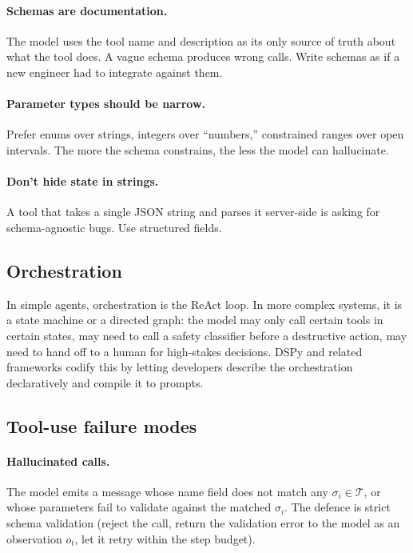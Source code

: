 \paragraph{Schemas are documentation.} The model uses the tool
name and description as its only source of truth about what the
tool does. A vague schema produces wrong calls. Write schemas as
if a new engineer had to integrate against them.

\paragraph{Parameter types should be narrow.} Prefer enums over
strings, integers over ``numbers,'' constrained ranges over open
intervals. The more the schema constrains, the less the model can
hallucinate.

\paragraph{Don't hide state in strings.} A tool that takes a
single JSON string and parses it server-side is asking for
schema-agnostic bugs. Use structured fields.

\subsection{Orchestration}

In simple agents, orchestration is the ReAct loop. In more
complex systems, it is a state machine or a directed graph: the
model may only call certain tools in certain states, may need to
call a safety classifier before a destructive action, may need to
hand off to a human for high-stakes decisions. DSPy
\citep{khattab2023dspy} and related frameworks codify this by
letting developers describe the orchestration declaratively and
compile it to prompts.

\subsection{Tool-use failure modes}

\paragraph{Hallucinated calls.} The model emits a message whose
name field does not match any $\sigma_i \in \mathcal{T}$, or whose
parameters fail to validate against the matched $\sigma_i$. The
defence is strict schema validation (reject the call, return the
validation error to the model as an observation $o_t$, let it
retry within the step budget).

